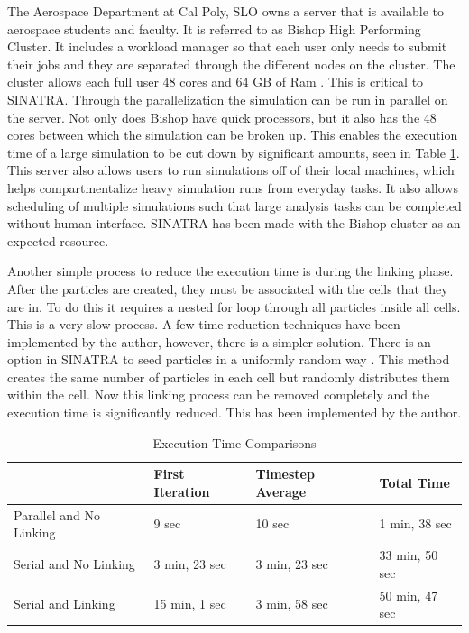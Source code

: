 \indent The Aerospace Department at Cal Poly, SLO owns a server that is available to aerospace students and faculty. It is referred to as Bishop High Performing Cluster\cite{hpc}. It includes a workload manager so that each user only needs to submit their jobs and they are separated through the different nodes on the cluster. The cluster allows each full user 48 cores and 64 GB of Ram \cite{hpc}. This is critical to SINATRA. Through the parallelization the simulation can be run in parallel on the server. Not only does Bishop have quick processors, but it also has the 48 cores between which the simulation can be broken up. This enables the execution time of a large simulation to be cut down by significant amounts, seen in Table \ref{tab:Timing}. This server also allows users to run simulations off of their local machines, which helps compartmentalize heavy simulation runs from everyday tasks. It also allows scheduling of multiple simulations such that large analysis tasks can be completed without human interface. SINATRA has been made with the Bishop cluster as an expected resource. \par

\indent Another simple process to reduce the execution time is during the linking phase. After the particles are created, they must be associated with the cells that they are in. To do this it requires a nested for loop  through all particles inside all cells. This is a very slow process. A few time reduction techniques have been implemented by the author, however, there is a simpler solution. There is an option in SINATRA to seed particles in a uniformly random way \cite{Galvez2018a}. This method creates the same number of particles in each cell but randomly distributes them within the cell. Now this linking process can be removed completely and the execution time is significantly reduced. This has been implemented by the author. \par

\begin{table}
\label{tab:Timing}
\caption{Execution Time Comparisons}
\vspace{0.3cm}
\begin{center}
\begin{tabular}{|l|l|l|l|}
\hline
                             & First Iteration & Timestep Average & Total Time     \\ \hline
Parallel and No Linking & 9 sec           & 10 sec           & 1 min, 38 sec  \\ \hline
Serial and No Linking   & 3 min, 23 sec   & 3 min, 23 sec    & 33 min, 50 sec \\ \hline
Serial and Linking      & 15 min, 1 sec   &  3 min, 58 sec   &   50 min, 47 sec             \\ \hline
\end{tabular}
\end{center}
\end{table}

